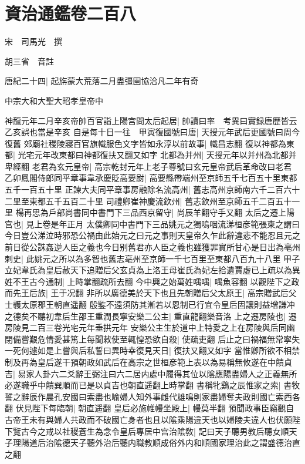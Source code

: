 \section{資治通鑑卷二百八}
宋　司馬光　撰

胡三省　音註

唐紀二十四|{
	起旃蒙大荒落二月盡彊圉協洽凡二年有奇}


中宗大和大聖大昭孝皇帝中

神龍元年二月辛亥帝帥百官詣上陽宫問太后起居|{
	帥讀曰率　考異曰實録唐歷皆云乙亥誤也當是辛亥}
自是每十日一往　甲寅復國號曰唐|{
	天授元年武后更國號曰周今復舊}
郊廟社稷陵寢百官旗幟服色文字皆如永淳以前故事|{
	幟昌志翻}
復以神都為東都|{
	光宅元年改東都曰神都復扶又翻又如字}
北都為并州|{
	天授元年以并州為北都并卑經翻}
老君為玄元皇帝|{
	高宗乾封元年上老子尊號曰玄元皇帝武后革命改曰老君}
乙卯鳳閣侍郎同平章事韋承慶貶高要尉|{
	高要縣帶端州至京師五千七百五十里東都五千一百五十里}
正諫大夫同平章事房融除名流高州|{
	舊志高州京師南六千二百六十二里至東都五千五百二十里}
司禮卿崔神慶流欽州|{
	舊志欽州至京師五千二百五十一里}
楊再思為戶部尚書同中書門下三品西京留守|{
	尚辰羊翻守手又翻}
太后之遷上陽宫也|{
	見上卷是年正月}
太僕卿同中書門下三品姚元之獨嗚咽流涕桓彦範張柬之謂曰今日豈公涕泣時邪恐公禍由此始元之曰元之事則天皇帝久乍此辭違悲不能忍且元之前日從公誅姦逆人臣之義也今日别舊君亦人臣之義也雖獲罪實所甘心是日出為亳州刺史|{
	此姚元之所以為多智也舊志亳州至京師一千七百里至東都八百九十八里}
甲子立妃韋氏為皇后赦天下追贈后父玄貞為上洛王母崔氏為妃左拾遺賈虚已上疏以為異姓不王古今通制|{
	上時掌翻疏所去翻}
今中興之始萬姓喁喁|{
	喁魚容翻}
以觀陛下之政而先王后族|{
	王于况翻}
非所以廣德美於天下也且先朝贈后父太原王|{
	高宗贈武后父士彠太原郡王朝直遥翻}
殷鍳不遠須防其漸若以恩制已行宜令皇后固讓則益增謙冲之德矣不聽初韋后生邵王重潤長寧安樂二公主|{
	重直龍翻樂音洛}
上之遷房陵也|{
	遷房陵見二百三卷光宅元年垂拱元年}
安樂公主生於道中上特愛之上在房陵與后同幽閉備嘗艱危情愛甚篤上每聞敕使至輒惶恐欲自殺|{
	使疏吏翻}
后止之曰禍福無常寧失一死何遽如是上嘗與后私誓曰異時幸復見天日|{
	復扶又翻又如字}
當惟卿所欲不相禁制及再為皇后遂干預朝政如武后在高宗之世桓彦範上表以為易稱無攸遂在中饋貞吉|{
	易家人卦六二爻辭王弼注曰六二居内處中履得其位以隂應陽盡婦人之正義無所必遂職乎中饋巽順而已是以貞吉也朝直遥翻上時掌翻}
書稱牝鷄之辰惟家之索|{
	書牧誓之辭辰作晨孔安國曰索盡也喻婦人知外事雌代雄鳴則家盡婦奪夫政則國亡索西各翻}
伏見陛下每臨朝|{
	朝直遥翻}
皇后必施帷幔坐殿上|{
	幔莫半翻}
預聞政事臣竊觀自古帝王未有與婦人共政而不破國亡身者也且以隂乘陽違天也以婦陵夫違人也伏願陛下覽古今之戒以社稷蒼生為念令皇后專居中宫治隂敎|{
	記曰天子聽男教后聽女順天子理陽道后治隂德天子聽外治后聽内職教順成俗外内和順國家理治此之謂盛德治直之翻}
